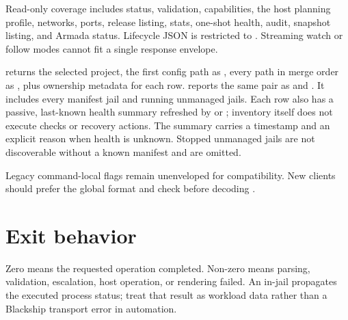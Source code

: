 Read-only coverage includes status, validation, capabilities, the host planning
profile, networks, ports,
release listing, stats, one-shot health, audit, snapshot listing, and Armada
status. Lifecycle JSON is restricted to . Streaming watch or
follow modes cannot fit a single response envelope.

 returns the selected project, the first config path as
, every path in merge order as ,
plus ownership metadata for each row.  reports the same pair as
 and . It includes every manifest jail and running unmanaged
jails. Each row also has a passive, last-known health summary refreshed by
 or ; inventory itself does not execute checks
or recovery actions. The summary carries a timestamp and an explicit reason
when health is unknown. Stopped unmanaged jails are not discoverable without a
known manifest and are omitted.

Legacy command-local  flags remain unenveloped for compatibility.
New clients should prefer the global format and check
 before decoding .

\section{Exit behavior}

Zero means the requested operation completed. Non-zero means parsing,
validation, escalation, host operation, or rendering failed. An in-jail
 propagates the executed process status; treat that result as
workload data rather than a Blackship transport error in automation.

